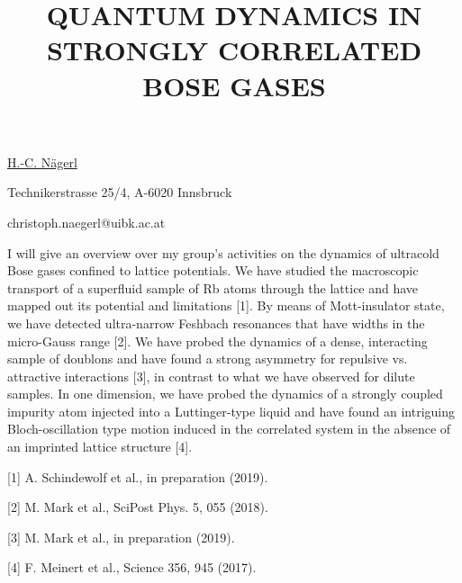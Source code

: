 \title{QUANTUM DYNAMICS IN STRONGLY CORRELATED BOSE GASES}

\underline{H.-C. N\"{a}gerl}  

{\normalsize{\vspace{-4mm}
Technikerstrasse 25/4,
A-6020 Innsbruck



\email christoph.naegerl@uibk.ac.at}}

I will give an overview over my group’s activities on the dynamics of ultracold Bose gases confined to lattice potentials. We have studied the macroscopic transport of a superfluid sample of Rb atoms through the lattice and have mapped out its potential and limitations [1]. By means of Mott-insulator state, we have detected ultra-narrow Feshbach resonances that have widths in the micro-Gauss range [2]. We have probed the dynamics of a dense, interacting sample of doublons and have found a strong asymmetry for repulsive vs. attractive interactions [3], in contrast to what we have observed for dilute samples. In one dimension, we have probed the dynamics of a strongly coupled impurity atom injected into a Luttinger-type liquid and have found an intriguing Bloch-oscillation type motion induced in the correlated system in the absence of an imprinted lattice structure [4].

{\normalsize
[1] A. Schindewolf et al., in preparation (2019).
\vsp

[2] M. Mark et al., SciPost Phys. 5, 055 (2018).
\vsp

[3] M. Mark et al., in  preparation (2019).
\vsp

[4] F. Meinert et al., Science 356, 945 (2017).
}


\vspace{\baselineskip}